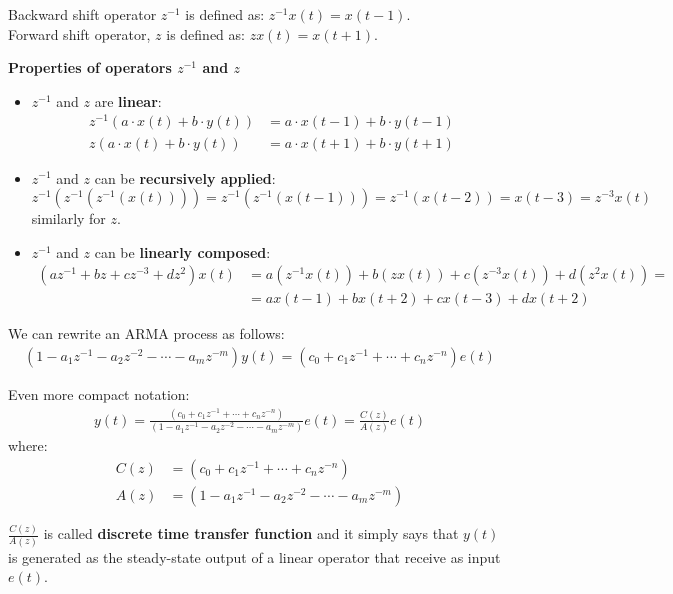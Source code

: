 \begin{definition}
Backward shift operator $z^{-1}$ is defined as: $z^{-1} x(t)=x(t-1)$.\\
Forward shift operator, $z$ is defined as: $z x(t)=x(t+1)$.	
\end{definition}

\textbf{Properties of operators $z^{-1}$ and $z$}

\begin{itemize}
	\item $z^{-1}$ and $z$ are \textbf{linear}:
		\begin{align*}
			z^{-1}(a \cdot x(t)+b \cdot y(t))&=a \cdot x(t-1)+b \cdot y(t-1) \\
			z(a \cdot x(t)+b \cdot y(t))&=a \cdot x(t+1)+b \cdot y(t+1)
		\end{align*}
	\item $z^{-1}$ and $z$ can be \textbf{recursively applied}:
		\[
			z^{-1}(z^{-1}(z^{-1}(x(t))))=z^{-1}(z^{-1}(x(t-1)))=z^{-1}(x(t-2))=x(t-3)=z^{-3} x(t)
		\]
		similarly for $z$.
	\item $z^{-1}$ and $z$ can be \textbf{linearly composed}:
		\begin{align*}
			(a z^{-1}+b z+c z^{-3}+d z^{2}) x(t)&=a(z^{-1} x(t))+b(z x(t))+c(z^{-3} x(t))+d(z^{2} x(t))= \\
			&=a x(t-1)+b x(t+2)+c x(t-3)+d x(t+2)
		\end{align*}
\end{itemize}

We can rewrite an ARMA process as follows:
\begin{align*}
	\left(1-a_{1} z^{-1}-a_{2} z^{-2}-\cdots-a_{m} z^{-m}\right) y(t)=\left(c_{0}+c_{1} z^{-1}+\cdots+c_{n} z^{-n}\right) e(t)
\end{align*}

Even more compact notation:
\begin{align*}
	y(t)=\frac{\left(c_{0}+c_{1} z^{-1}+\cdots+c_{n} z^{-n}\right)}{\left(1-a_{1} z^{-1}-a_{2} z^{-2}-\cdots-a_{m} z^{-m}\right)} e(t)=\frac{C(z)}{A(z)} e(t)
\end{align*}
where:
\begin{align*}
	C(z)&=\left(c_{0}+c_{1} z^{-1}+\cdots+c_{n} z^{-n}\right) \\
	A(z)&=\left(1-a_{1} z^{-1}-a_{2} z^{-2}-\cdots-a_{m} z^{-m}\right)
\end{align*}

$\frac{C(z)}{A(z)}$ is called \textbf{discrete time transfer function} and it simply says that $y(t)$ is generated as the steady-state output of a linear operator that receive as input $e(t)$.